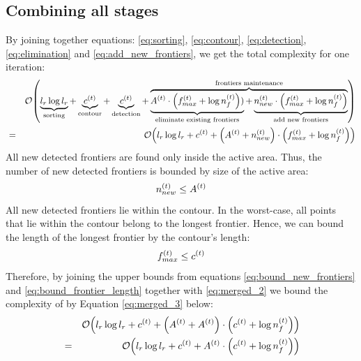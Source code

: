 \subsection{Combining all stages}
By joining together equations: \eqref{eq:sorting}, \eqref{eq:contour},
\eqref{eq:detection}, \eqref{eq:elimination} and \eqref{eq:add_new_frontiers},
we get the total complexity for one iteration:
\begin{eqnarray}\label{eq:merged_2}
&&\mathcal{O}{\left( \underbrace{l_r\log{l_r}}_{\textrm{sorting}} + 
        \underbrace{c^{\left(t\right)}}_{\textrm{contour}} +
        \underbrace{c^{\left(t\right)}}_{\textrm{detection}} +
        \overbrace{\underbrace{A^{\left(t\right)} \cdot
                {\left(f_{max}^{\left(t\right)} +
                \log{n_f^{\left(t\right)}}\right)})}_{\textrm{eliminate
                existing frontiers}} + 
                \underbrace{n_{new}^{\left(t\right)} 
                \cdot {\left(f_{max}^{\left(t\right)} + \log{n_f^{\left(t\right)}}
                \right)}}_{\textrm{add new frontiers}}}^{\textrm{frontiers
                maintenance}} \right)}
\nonumber \\
&=&\mathcal{O}{\left( l_r\log{l_r} + 
        c^{\left(t\right)} +
        {\left(A^{\left(t\right)} + n_{new}^{\left(t\right)}\right)}
        \cdot {\left(f_{max}^{\left(t\right)} +
        \log{n_f^{\left(t\right)}}\right)} \right)}
\end{eqnarray}
All new detected frontiers are found only inside the active area. Thus, the
number of new detected frontiers is bounded by size of the active area:
\begin{equation}\label{eq:bound_new_frontiers}
n_{new}^{\left(t\right)} \le A^{\left(t\right)}
\end{equation}
All new detected frontiers lie within the contour. In the worst-case, all
points that lie within the contour belong to the longest frontier. Hence,
we can bound the length of the longest frontier by the contour's length:
\begin{equation}\label{eq:bound_frontier_length}
f_{max}^{\left(t\right)} \le c^{\left(t\right)}
\end{equation}
Therefore, by joining the upper bounds from equations
\eqref{eq:bound_new_frontiers} and
\eqref{eq:bound_frontier_length} together with \eqref{eq:merged_2} we bound the
complexity of \FFD by Equation \eqref{eq:merged_3} below:
\begin{eqnarray}\label{eq:merged_3}
&&\mathcal{O}{\left(l_r\log{l_r} + 
        c^{\left(t\right)} +
        {\left(A^{\left(t\right)} + A^{\left(t\right)}\right)} \cdot
        {\left(c^{\left(t\right)} +
        \log{n_f^{\left(t\right)}}\right)} 
       \right)} \nonumber \\
&=&\mathcal{O}{\left(l_r\log{l_r} + 
        c^{\left(t\right)} +
        A^{\left(t\right)} \cdot
        {\left(c^{\left(t\right)} +
        \log{n_f^{\left(t\right)}}\right)}
        \right)}
\end{eqnarray}
